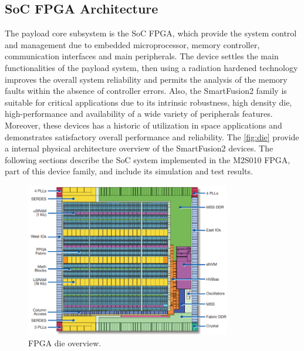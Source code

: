 
\newpage

\subsection{SoC FPGA Architecture} \label{subsec:fpga}

The payload core subsystem is the SoC FPGA, which provide the system control and management due to embedded microprocessor, memory controller, communication interfaces and main peripherals. The device settles the main functionalities of the payload system, then using a radiation hardened technology improves the overall system reliability and permits the analysis of the memory faults within the absence of controller errors. Also, the SmartFusion2 family is suitable for critical applications due to its intrinsic robustness, high density die, high-performance and availability of a wide variety of peripherals
features. Moreover, these devices has a historic of utilization in space applications and demonstrates satisfactory overall performance and reliability. The \autoref{fig:die} provide a internal physical architecture overview of the SmartFusion2 devices. The following sections describe the SoC system implemented in the M2S010 FPGA, part of this device family, and include its simulation and test results.

\begin{figure}[!ht]
    \begin{center}
        \includegraphics[width=0.8\textwidth]{figures/die.png}
        \caption{FPGA die overview.}
        \label{fig:die}
    \end{center}
\end{figure}

